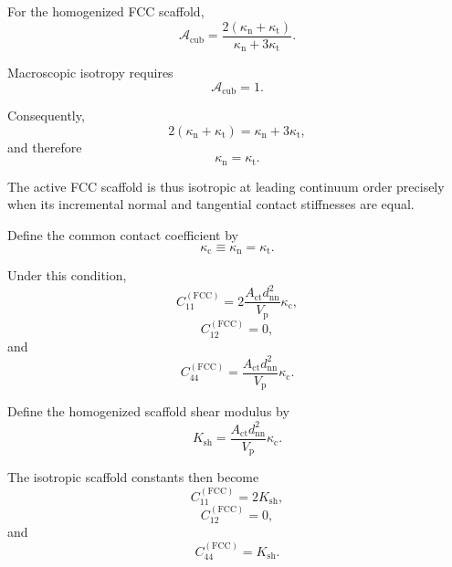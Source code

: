 For the homogenized FCC scaffold,
\begin{equation}
    \boxed{ \mathcal{A}_{\mathrm{cub}} = \frac{ 2 \left( \kappa_{\mathrm{n}} + \kappa_{\mathrm{t}} \right) }{ \kappa_{\mathrm{n}} + 3\kappa_{\mathrm{t}} }. }
\end{equation}

Macroscopic isotropy requires
\begin{equation}
    \mathcal{A}_{\mathrm{cub}} = 1.
\end{equation}

Consequently,
\begin{equation}
    2 \left( \kappa_{\mathrm{n}} + \kappa_{\mathrm{t}} \right) = \kappa_{\mathrm{n}} + 3\kappa_{\mathrm{t}},
\end{equation}
and therefore
\begin{equation}
    \boxed{ \kappa_{\mathrm{n}} = \kappa_{\mathrm{t}}. }
\end{equation}

The active FCC scaffold is thus isotropic at leading continuum order precisely when its incremental normal and tangential contact stiffnesses are equal.

Define the common contact coefficient by
\begin{equation}
    \boxed{ \kappa_{\mathrm{c}} \equiv \kappa_{\mathrm{n}} = \kappa_{\mathrm{t}}. }
\end{equation}

Under this condition,
\begin{equation}
    C_{11}^{(\mathrm{FCC})} = 2 \frac{ A_{\mathrm{ct}}d_{\mathrm{nn}}^2 }{ V_{\mathrm{p}} } \kappa_{\mathrm{c}},
\end{equation}
\begin{equation}
    C_{12}^{(\mathrm{FCC})} = 0,
\end{equation}
and
\begin{equation}
    C_{44}^{(\mathrm{FCC})} = \frac{ A_{\mathrm{ct}}d_{\mathrm{nn}}^2 }{ V_{\mathrm{p}} } \kappa_{\mathrm{c}}.
\end{equation}

Define the homogenized scaffold shear modulus by
\begin{equation}
    \boxed{ K_{\mathrm{sh}} = \frac{ A_{\mathrm{ct}}d_{\mathrm{nn}}^2 }{ V_{\mathrm{p}} } \kappa_{\mathrm{c}}. }
\end{equation}

The isotropic scaffold constants then become
\begin{equation}
    C_{11}^{(\mathrm{FCC})} = 2K_{\mathrm{sh}},
\end{equation}
\begin{equation}
    C_{12}^{(\mathrm{FCC})} = 0,
\end{equation}
and
\begin{equation}
    C_{44}^{(\mathrm{FCC})} = K_{\mathrm{sh}}.
\end{equation}

